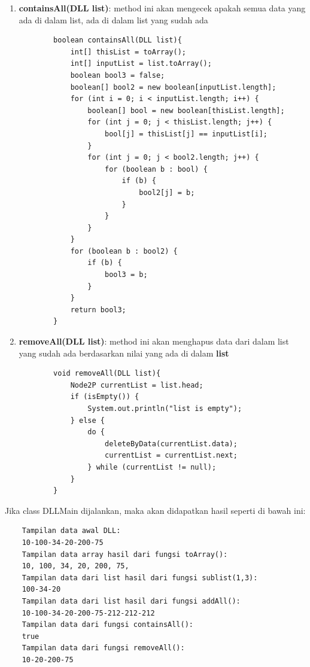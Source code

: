 \documentclass[12pt,titlepage]{article}
\begin{document}
\begin{enumerate}
\begin{verbatim}
        }
    \end{verbatim}
    \item \textbf{containsAll(DLL list)}: method ini akan mengecek apakah semua data yang ada di dalam list, ada di dalam list yang sudah ada
    \begin{verbatim}
        boolean containsAll(DLL list){
            int[] thisList = toArray();
            int[] inputList = list.toArray();
            boolean bool3 = false;
            boolean[] bool2 = new boolean[inputList.length];
            for (int i = 0; i < inputList.length; i++) {
                boolean[] bool = new boolean[thisList.length];
                for (int j = 0; j < thisList.length; j++) {
                    bool[j] = thisList[j] == inputList[i];
                }
                for (int j = 0; j < bool2.length; j++) { 
                    for (boolean b : bool) {
                        if (b) {
                            bool2[j] = b;
                        }
                    }
                }
            }
            for (boolean b : bool2) {
                if (b) {
                    bool3 = b;
                }
            }
            return bool3;
        }
    \end{verbatim}
    \item \textbf{removeAll(DLL list)}: method ini akan menghapus data dari dalam list yang sudah ada berdasarkan nilai yang ada di dalam \textbf{list}
    \begin{verbatim}
        void removeAll(DLL list){
            Node2P currentList = list.head;
            if (isEmpty()) {
                System.out.println("list is empty");
            } else {
                do {
                    deleteByData(currentList.data);
                    currentList = currentList.next;
                } while (currentList != null);
            }
        }
    \end{verbatim}
\end{enumerate}
Jika class DLLMain dijalankan, maka akan didapatkan hasil seperti di bawah ini:
\begin{verbatim}
    Tampilan data awal DLL:
    10-100-34-20-200-75
    Tampilan data array hasil dari fungsi toArray():
    10, 100, 34, 20, 200, 75,
    Tampilan data dari list hasil dari fungsi sublist(1,3):
    100-34-20
    Tampilan data dari list hasil dari fungsi addAll():
    10-100-34-20-200-75-212-212-212
    Tampilan data dari fungsi containsAll():
    true
    Tampilan data dari fungsi removeAll():
    10-20-200-75
\end{verbatim}
\end{document}
